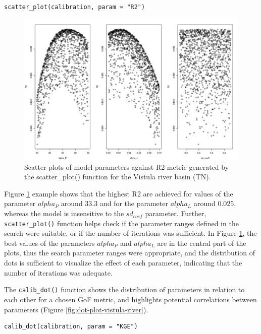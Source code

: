 \begin{verbatim}
scatter_plot(calibration, param = "R2")
\end{verbatim}

\begin{figure}[H]
\includegraphics[width=1\linewidth,height=0.31\textheight]{figures/fig4} \caption{Scatter plots of model parameters against R2 metric generated by the scatter\_plot() function for the Vistula river basin (TN).}\label{fig:scatter-plot-vistula-river}
\end{figure}

\noindent Figure \ref{fig:scatter-plot-vistula-river} example shows that the highest R2 are achieved for values of the parameter \(alpha_P\) around \(33.3\) and for the parameter \(alpha_L\) around \(0.025\), whereas the model is insensitive to the \(sd_{coef}\) parameter. Further, \texttt{scatter\_plot()} function helps check if the parameter ranges defined in the search were suitable, or if the number of iterations was sufficient. In Figure \ref{fig:scatter-plot-vistula-river}, the best values of the parameters \(alpha_P\) and \(alpha_L\) are in the central part of the plots, thus the search parameter ranges were appropriate, and the distribution of dots is sufficient to visualize the effect of each parameter, indicating that the number of iterations was adequate.

The \texttt{calib\_dot()} function shows the distribution of parameters in relation to each other for a chosen GoF metric, and highlights potential correlations between parameters (Figure \ref{fig:dot-plot-vistula-river}).

\begin{verbatim}
calib_dot(calibration, param = "KGE") 
\end{verbatim}

